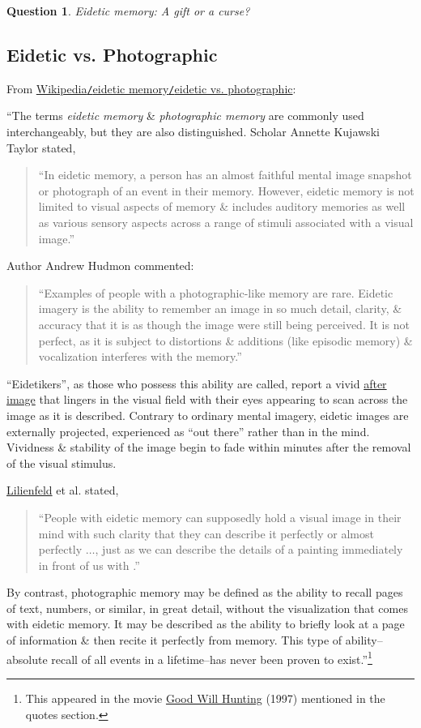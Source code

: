 \documentclass[oneside]{book}
\numberwithin{equation}{section}
\newtheorem{question}{Question}[chapter]
\begin{document}
\begin{question}
	Eidetic memory: A gift or a curse?
\end{question}

\subsection{Eidetic vs. Photographic}
From \href{https://en.wikipedia.org/wiki/Eidetic_memory#Eidetic_vs._photographic}{Wikipedia\texttt{/}eidetic memory\texttt{/}eidetic vs. photographic}:

``The terms \textit{eidetic memory} \& \textit{photographic memory} are commonly used interchangeably, but they are also distinguished. Scholar Annette Kujawski Taylor stated,
\begin{quotation}
	``In eidetic memory, a person has an almost faithful mental image snapshot or photograph of an event in their memory. However, eidetic memory is not limited to visual aspects of memory \& includes auditory memories as well as various sensory aspects across a range of stimuli associated with a visual image.''
\end{quotation}
Author Andrew Hudmon commented:
\begin{quotation}
	``Examples of people with a photographic-like memory are rare. Eidetic imagery is the ability to remember an image in so much detail, clarity, \& accuracy that it is as though the image were still being perceived. It is not perfect, as it is subject to distortions \& additions (like episodic memory) \& vocalization interferes with the memory.''
\end{quotation}
``Eidetikers'', as those who possess this ability are called, report a vivid \href{https://en.wikipedia.org/wiki/Afterimage}{after image} that lingers in the visual field with their eyes appearing to scan across the image as it is described. Contrary to ordinary mental imagery, eidetic images are externally projected, experienced as ``out there'' rather than in the mind. Vividness \& stability of the image begin to fade within minutes after the removal of the visual stimulus.

\href{https://en.wikipedia.org/wiki/Scott_Lilienfeld}{Lilienfeld} et al. stated,
\begin{quotation}
	``People with eidetic memory can supposedly hold a visual image in their mind with such clarity that they can describe it perfectly or almost perfectly $\ldots$, just as we can describe the details of a painting immediately in front of us with .''
\end{quotation}
By contrast, photographic memory may be defined as the ability to recall pages of text, numbers, or similar, in great detail, without the visualization that comes with eidetic memory. It may be described as the ability to briefly look at a page of information \& then recite it perfectly from memory. This type of ability--absolute recall of all events in a lifetime--has never been proven to exist.''\footnote{This appeared in the movie \href{https://www.imdb.com/title/tt0119217/}{Good Will Hunting} (1997) mentioned in the quotes section.}
\end{document}
